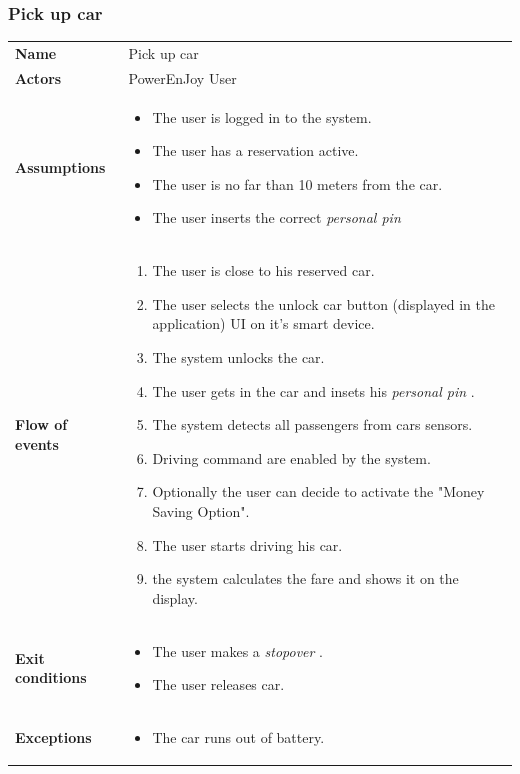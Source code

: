 \documentclass[english]{article}
\newcommand{\stopover}{\textit{stopover }}
\newcommand{\personalpin}{\textit{personal pin }}
\begin{document}
	\subsubsection{Pick up car}
	\begin{center}
	\begin{tabular}{l||p{10cm}}
	\textbf{Name} 
		& Pick up car\\ [8px]
	\textbf{Actors} 
		& PowerEnJoy User\\ [8px]
	\textbf{Assumptions} 
	& \begin{itemize}
		\item The user is logged in to the system.
		\item The user has a reservation active.
		\item The user is no far than 10 meters from the car.
		\item The user inserts the correct \personalpin 
	\end{itemize}\\
	\textbf{Flow of events}
		& \begin{enumerate}
 		\item The user is close to his reserved car.
 		\item The user selects the unlock car button (displayed in the application) UI on it's smart device.
		\item The system unlocks the car.
		\item The user gets in the car and insets his \personalpin.
		\item The system detects all passengers from cars sensors.
		\item Driving command are enabled by the system. 
		\item Optionally the user can decide to activate the "Money Saving Option".
		\item The user starts driving his car.
		\item the system calculates the fare and shows it on the display.
		\end{enumerate}\\ 
	\textbf{Exit conditions}
		&\begin{itemize}
			\item The user makes a \stopover.
			\item The user releases car.
		\end{itemize}\\
	\textbf{Exceptions}
		& \begin{itemize}
			\item The car runs out of battery.
		\end{itemize}
	\end{tabular}
	\end{center}
	
\end{document}

